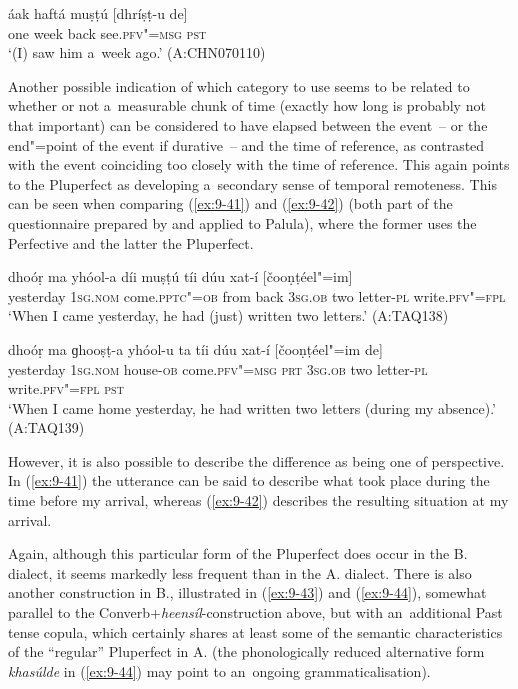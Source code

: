 \begin{exe}
\ex
\label{ex:9-40}
\gll áak haftá muṣṭú [dhríṣṭ-u de]  \\
one week back see.\textsc{pfv"=msg} \textsc{pst} \\
\glt `(I) saw him a~week ago.' (A:CHN070110)
\end{exe}

Another possible indication of which category to use seems to be related to whether or not a~measurable chunk of time (exactly how long is probably not that important) can be considered to have elapsed between the event~-- or the end"=point of the event if durative~-- and the time of reference, as contrasted with the event coinciding too closely with the time of reference. This again points to the Pluperfect as developing a~secondary sense of temporal remoteness. This can be seen when comparing (\ref{ex:9-41}) and (\ref{ex:9-42}) (both part of the questionnaire prepared by \citet{dahl1985} and applied to Palula), where the former uses the Perfective and the latter the Pluperfect.

\begin{exe}
\ex
\label{ex:9-41}
\gll \label{bkm:Ref190742986}dhoóṛ ma yhóol-a díi muṣṭú tíi dúu xat-í [čooṇṭéel"=im] \\
yesterday 1\textsc{sg.nom} come.\textsc{pptc"=ob} from back \textsc{3sg.ob} two letter-\textsc{pl} write.\textsc{pfv"=fpl} \\
\glt `When I came yesterday, he had (just) written two letters.' (A:TAQ138)

\ex
\label{ex:9-42}
\gll dhoóṛ ma ɡhooṣṭ-a yhóol-u ta tíi dúu xat-í [čooṇṭéel"=im de] \\
yesterday 1\textsc{sg.nom} house-\textsc{ob} come.\textsc{pfv"=msg}  \textsc{prt} \textsc{3sg.ob} two letter-\textsc{pl} write.\textsc{pfv"=fpl} \textsc{pst} \\
\glt `When I came home yesterday, he had written two letters (during my absence).' (A:TAQ139)
\end{exe}

However, it is also possible to describe the difference as being one of perspective. In (\ref{ex:9-41}) the utterance can be said to describe what took place during the time before my arrival, whereas (\ref{ex:9-42}) describes the resulting situation at my arrival.


Again, although this particular form of the Pluperfect does occur in the B. dialect, it seems markedly less frequent than in the A. dialect. There is also another construction in B., illustrated in (\ref{ex:9-43}) and (\ref{ex:9-44}), somewhat parallel to the Converb+\textit{heensíl}-construction above, but with an~additional Past tense copula, which certainly shares at least some of the semantic characteristics of the ``regular'' Pluperfect in A. (the phonologically reduced alternative form \textit{khasúlde} in (\ref{ex:9-44}) may point to an~ongoing grammaticalisation).

